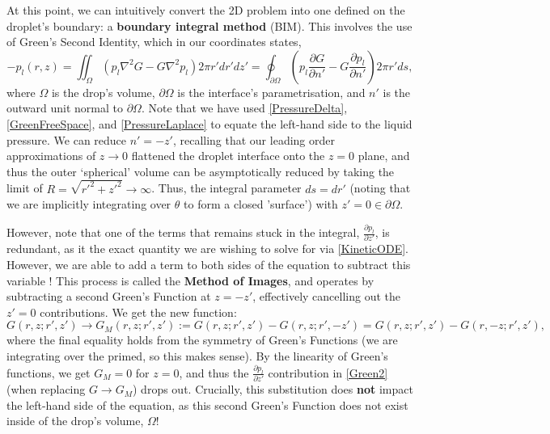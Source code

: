 \documentclass[11pt,a4paper]{article}
\begin{document}
	At this point, we can intuitively convert the 2D problem into one defined on the droplet's boundary: a \textbf{boundary integral method} (BIM). This involves the use of Green's Second Identity, which in our coordinates states,
	\begin{equation}
		\label{Green2}
		-p_l(r,z) = \iint_\Omega \left(p_l \nabla^2 G - G \nabla^2 p_l\right) 2\pi r' dr' dz' = \oint_{\partial\Omega} \left(p_l \frac{\partial G}{\partial n'} - G \frac{\partial p_l}{\partial n'}\right) 2\pi r' ds,
	\end{equation}
	where $\Omega$ is the drop's volume, $\partial \Omega$ is the interface's parametrisation, and $n'$ is the outward unit normal to $\partial \Omega$. Note that we have used \eqref{PressureDelta}, \eqref{GreenFreeSpace}, and \eqref{PressureLaplace} to equate the left-hand side to the liquid pressure. We can reduce $n' = -z'$, recalling that our leading order approximations of $z \to 0$ flattened the droplet interface onto the $z=0$ plane, and thus the outer `spherical' volume can be asymptotically reduced by taking the limit of $R = \sqrt{r'^2 + z'^2} \to \infty $. Thus, the integral parameter $ds = dr'$ (noting that we are implicitly integrating over $\theta$ to form a closed 'surface') with $z'=0 \in \partial \Omega$.
	
	However, note that one of the terms that remains stuck in the integral, $\frac{\partial p_l}{\partial z'}$, is redundant, as it the exact quantity we are wishing to solve for via \eqref{KineticODE}. However, we are able to add a term to both sides of the equation to subtract this variable ! This process is called the \textbf{Method of Images}, and operates by subtracting a second Green's Function at $z = -z'$, effectively cancelling out the $z' = 0$ contributions. We get the new function:
	$$G(r,z; r',z') \to G_M(r,z;r',z') := G(r,z; r',z') - G(r,z; r',-z') = G(r,z; r',z') - G(r,-z; r',z'),$$
	where the final equality holds from the symmetry of Green's Functions (we are integrating over the primed, so this makes sense). By the linearity of Green's functions, we get $G_M = 0$ for $z=0$, and thus the $\frac{\partial p_l}{\partial z'}$ contribution in \eqref{Green2} (when replacing $G \to G_M$) drops out. Crucially, this substitution does \textbf{not} impact the left-hand side of the equation, as this second Green's Function does not exist inside of the drop's volume, $\Omega$!
	
\end{document}
